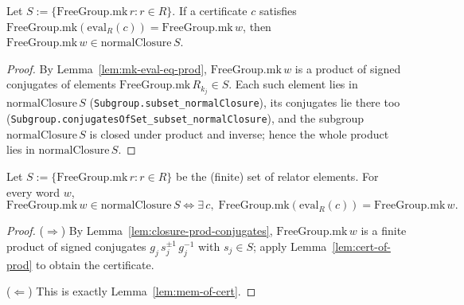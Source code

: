 \begin{lemma}
    \label{lem:mem-of-cert}
    \leanok
    Let $S := \{\mathrm{FreeGroup.mk}\,r : r \in R\}$. If a certificate $c$
    satisfies $\mathrm{FreeGroup.mk}(\mathrm{eval}_R(c)) = \mathrm{FreeGroup.mk}\,w$,
    then $\mathrm{FreeGroup.mk}\,w \in \mathrm{normalClosure}\,S$.
\end{lemma}
\begin{proof}
    By Lemma~\ref{lem:mk-eval-eq-prod}, $\mathrm{FreeGroup.mk}\,w$ is a product of
    signed conjugates of elements $\mathrm{FreeGroup.mk}\,R_{k_j} \in S$. Each such
    element lies in $\mathrm{normalClosure}\,S$
    (\texttt{Subgroup.subset\_normalClosure}), its conjugates lie there too
    (\texttt{Subgroup.conjugatesOfSet\_subset\_normalClosure}), and the subgroup
    $\mathrm{normalClosure}\,S$ is closed under product and inverse; hence the
    whole product lies in $\mathrm{normalClosure}\,S$.
\end{proof}

\begin{lemma}
    \label{lem:mem-normalClosure-cert}
    \leanok
    Let $S := \{\mathrm{FreeGroup.mk}\,r : r \in R\}$ be the (finite) set of
    relator elements. For every word $w$,
    \[
        \mathrm{FreeGroup.mk}\,w \in \mathrm{normalClosure}\,S
        \iff \exists\, c,\; \mathrm{FreeGroup.mk}(\mathrm{eval}_R(c))
              = \mathrm{FreeGroup.mk}\,w .
    \]
\end{lemma}
\begin{proof}
    ($\Rightarrow$) By Lemma~\ref{lem:closure-prod-conjugates},
    $\mathrm{FreeGroup.mk}\,w$ is a finite product of signed conjugates
    $g_j\, s_j^{\pm 1}\, g_j^{-1}$ with $s_j \in S$; apply
    Lemma~\ref{lem:cert-of-prod} to obtain the certificate.

    ($\Leftarrow$) This is exactly Lemma~\ref{lem:mem-of-cert}.
\end{proof}

